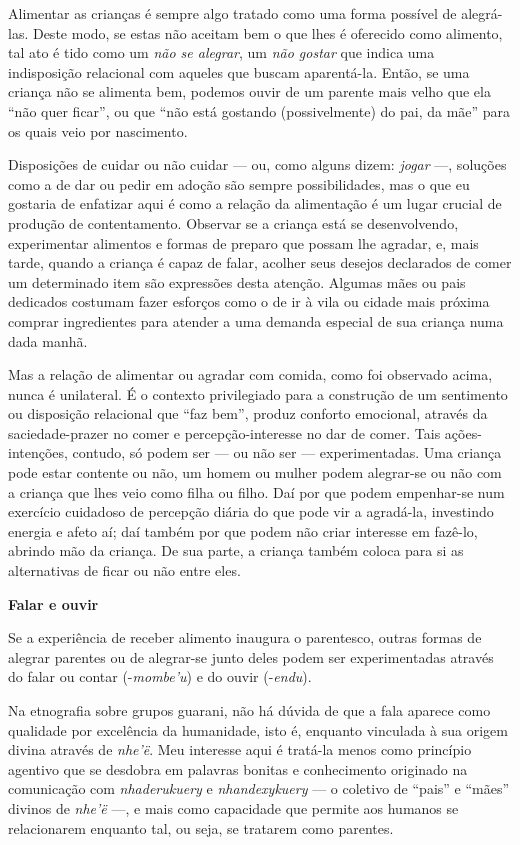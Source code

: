 Alimentar as crianças é sempre algo tratado como uma forma possível de
alegrá-las. Deste modo, se estas não aceitam bem o que lhes é oferecido
como alimento, tal ato é tido como um \emph{não se alegrar}, um
\emph{não gostar} que indica uma indisposição relacional com aqueles que
buscam aparentá-la. Então, se uma criança não se alimenta bem, podemos
ouvir de um parente mais velho que ela ``não quer ficar'', ou que ``não
está gostando (possivelmente) do pai, da mãe'' para os quais veio por
nascimento.

Disposições de cuidar ou não cuidar --- ou, como alguns dizem:
\emph{jogar} ---, soluções como a de dar ou pedir em adoção são sempre
possibilidades, mas o que eu gostaria de enfatizar aqui é como a relação
da alimentação é um lugar crucial de produção de contentamento. Observar
se a criança está se desenvolvendo, experimentar alimentos e formas de
preparo que possam lhe agradar, e, mais tarde, quando a criança é capaz
de falar, acolher seus desejos declarados de comer um determinado item
são expressões desta atenção. Algumas mães ou pais dedicados costumam
fazer esforços como o de ir à vila ou cidade mais próxima comprar
ingredientes para atender a uma demanda especial de sua criança numa
dada manhã.

Mas a relação de alimentar ou agradar com comida, como foi observado
acima, nunca é unilateral. É o contexto privilegiado para a construção
de um sentimento ou disposição relacional que ``faz bem'', produz
conforto emocional, através da saciedade-prazer no comer e
percepção-interesse no dar de comer. Tais ações-intenções, contudo, só
podem ser --- ou não ser --- experimentadas. Uma criança pode estar
contente ou não, um homem ou mulher podem alegrar-se ou não com a
criança que lhes veio como filha ou filho. Daí por que podem empenhar-se
num exercício cuidadoso de percepção diária do que pode vir a agradá-la,
investindo energia e afeto aí; daí também por que podem não criar
interesse em fazê-lo, abrindo mão da criança. De sua parte, a criança
também coloca para si as alternativas de ficar ou não entre eles.

\textbf{Falar e ouvir}

Se a experiência de receber alimento inaugura o parentesco, outras
formas de alegrar parentes ou de alegrar-se junto deles podem ser
experimentadas através do falar ou contar (-\emph{mombe'u}) e do ouvir
(-\emph{endu}).

Na etnografia sobre grupos guarani, não há dúvida de que a fala aparece
como qualidade por excelência da humanidade, isto é, enquanto vinculada
à sua origem divina através de \emph{nhe'ë}. Meu interesse aqui é
tratá-la menos como princípio agentivo que se desdobra em palavras
bonitas e conhecimento originado na comunicação com \emph{nhaderukuery}
e \emph{nhandexykuery} --- o coletivo de ``pais'' e ``mães'' divinos de
\emph{nhe'ë} ---, e mais como capacidade que permite aos humanos se
relacionarem enquanto tal, ou seja, se tratarem como parentes.


